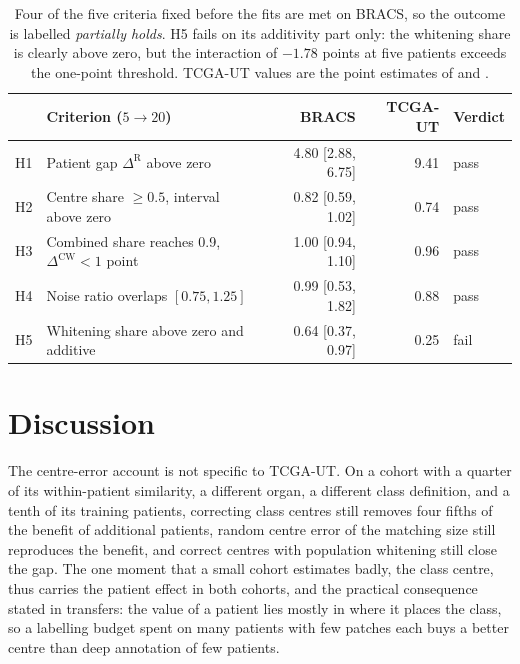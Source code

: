 \documentclass[11pt]{article}
\begin{document}
\begin{table}[htbp]
\centering
\small
\renewcommand{\arraystretch}{1.15}
\begin{tabularx}{\textwidth}{@{}lYrrl@{}}
\toprule
 & Criterion ($5\to20$) & BRACS & TCGA-UT & Verdict \\
\midrule
H1 & Patient gap $\Delta^{\mathrm R}$ above zero & 4.80 [2.88, 6.75] & 9.41 & pass \\
H2 & Centre share $\ge0.5$, interval above zero & 0.82 [0.59, 1.02] & 0.74 & pass \\
H3 & Combined share reaches 0.9, $\Delta^{\mathrm{CW}}<1$ point & 1.00 [0.94, 1.10] & 0.96 & pass \\
H4 & Noise ratio overlaps $[0.75,1.25]$ & 0.99 [0.53, 1.82] & 0.88 & pass \\
H5 & Whitening share above zero and additive & 0.64 [0.37, 0.97] & 0.25 & fail \\
\bottomrule
\end{tabularx}
\caption{Four of the five criteria fixed before the fits are met on BRACS, so the outcome is labelled \emph{partially holds}. H5 fails on its additivity part only: the whitening share is clearly above zero, but the interaction of $-1.78$ points at five patients exceeds the one-point threshold. TCGA-UT values are the point estimates of \citet{queisler2026centreError} and \citet{queisler2026patientDirections}.}
\label{tab:criteria}
\end{table}

\section{Discussion}
\label{sec:discussion}
The centre-error account is not specific to TCGA-UT. On a cohort with a quarter of its within-patient similarity, a different organ, a different class definition, and a tenth of its training patients, correcting class centres still removes four fifths of the benefit of additional patients, random centre error of the matching size still reproduces the benefit, and correct centres with population whitening still close the gap. The one moment that a small cohort estimates badly, the class centre, thus carries the patient effect in both cohorts, and the practical consequence stated in \citet{queisler2026centreError} transfers: the value of a patient lies mostly in where it places the class, so a labelling budget spent on many patients with few patches each buys a better centre than deep annotation of few patients.
\end{document}

